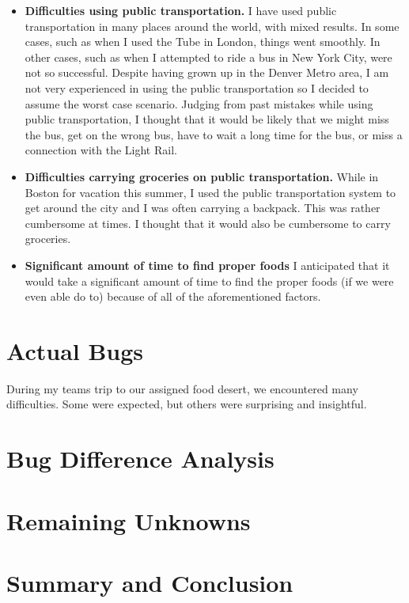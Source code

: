 \documentclass[11pt]{article}
\begin{document}
\begin{itemize}
    \item \textbf{Difficulties using public transportation.} I have used public transportation in
        many places around the world, with mixed results. In some cases, such as when I used the
        Tube in London, things went smoothly. In other cases, such as when I attempted to ride a bus
        in New York City, were not so successful. Despite having grown up in the Denver Metro area,
        I am not very experienced in using the public transportation so I decided to assume the
        worst case scenario. Judging from past mistakes while using public transportation, I thought
        that it would be likely that we might miss the bus, get on the wrong bus, have to wait a
        long time for the bus, or miss a connection with the Light Rail.

    \item \textbf{Difficulties carrying groceries on public transportation.} While in Boston for
        vacation this summer, I used the public transportation system to get around the city and I
        was often carrying a backpack. This was rather cumbersome at times. I thought that it would
        also be cumbersome to carry groceries.

    \item \textbf{Significant amount of time to find proper foods} I anticipated that it would take
        a significant amount of time to find the proper foods (if we were even able do to) because
        of all of the aforementioned factors.
\end{itemize}

\section{Actual Bugs}
During my teams trip to our assigned food desert, we encountered many difficulties. Some were
expected, but others were surprising and insightful.

\section{Bug Difference Analysis}

\section{Remaining Unknowns}

\section{Summary and Conclusion}
\end{document}
